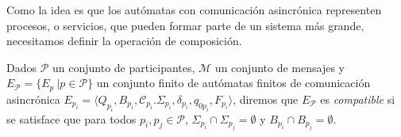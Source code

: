 Como la idea es que los autómatas con comunicación asincrónica representen procesos, o servicios, que pueden formar parte de un sistema más grande, necesitamos definir la operación de composición. 

\begin{definition}[Compatibilidad]
Dados $\mathcal{P}$ un conjunto de participantes, $\mathcal{M}$ un conjunto de mensajes y $E_\mathcal{P} = \{E_{p} \ | p \in \mathcal{P}\}$ un conjunto finito de autómatas finitos de comunicación asincrónica $E_{p_i}= \langle Q_{p_i}, B_{p_i}, \mathcal{C}_{p_i}. \Sigma_{p_i}, \delta_{p_i}, q_{0{p_i}}, F_{p_i} \rangle$, diremos que $E_\mathcal{P}$ es \emph{compatible} si se satisface que para todos $p_i, p_j \in \mathcal{P}$, $\Sigma_{p_i} \cap \Sigma_{p_j}= \emptyset$ y $B_{p_i} \cap B_{p_j} = \emptyset$.
\end{definition}

